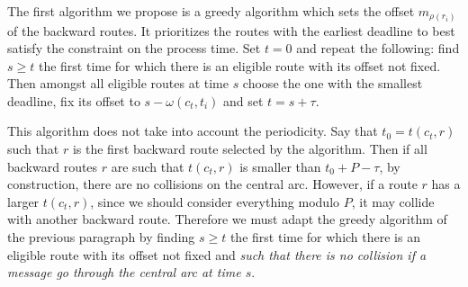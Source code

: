 \documentclass[10pt, conference, letterpaper]{IEEEtran}
\begin{document}
    The first algorithm we propose is a greedy algorithm which sets the offset $m_{\rho(r_i)}$ of the 
    backward routes. It prioritizes the routes with the earliest deadline to best satisfy the
    constraint on the process time. Set $t=0$ and repeat the following: find $s \geq t$ the first time for which there is an eligible route with its offset not fixed. Then amongst all eligible routes at time $s$ choose the one with the smallest deadline, fix its offset to $s - \omega(c_t,t_i) $ and set $t = s + \tau$.
    
    This algorithm does not take into account the periodicity. Say that $t_0 = t(c_t,r)$ such that $r$ is the first backward route selected by the algorithm. Then if all backward routes $r$ are such that $t(c_t,r)$ is smaller than $t_0 + P - \tau$,
    by construction, there are no collisions on the central arc.
    However, if a route $r$ has a larger $t(c_t,r)$, since we should consider everything modulo $P$, 
    it may collide with another backward route. Therefore we must adapt the greedy algorithm of the previous paragraph by finding $s \geq t$ the first time for which there is an eligible route with its offset not fixed and \emph{such that there is no collision if a message go through the central arc at time $s$}. 
    
\end{document}
